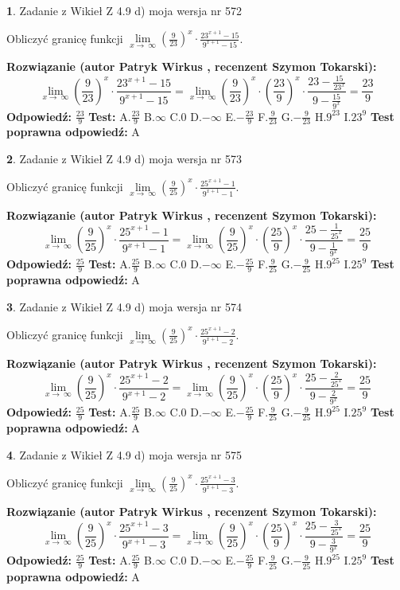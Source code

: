 \documentclass[12pt, a4paper]{article}
\theoremstyle{definition} %
\newtheorem{zad}{}
\newcommand{\zadStart}[1]{\begin{zad}#1\newline}
\newcommand{\zadStop}{\end{zad}}
\newcommand{\rozwStart}[2]{\noindent \textbf{Rozwiązanie (autor #1 , recenzent #2): }\newline}
\newcommand{\rozwStop}{\newline}
\newcommand{\odpStart}{\noindent \textbf{Odpowiedź:}\newline}
\newcommand{\odpStop}{\newline}
\newcommand{\testStart}{\noindent \textbf{Test:}\newline}
\newcommand{\testStop}{\newline}
\newcommand{\kluczStart}{\noindent \textbf{Test poprawna odpowiedź:}\newline}
\newcommand{\kluczStop}{\newline}
\begin{document}
\zadStart{Zadanie z Wikieł Z 4.9 d) moja wersja nr 572}


Obliczyć granicę funkcji  $\lim\limits_{x\to\ \infty}(\frac{9}{23})^{x}\cdot\frac{23^{x+1}-15}{9^{x+1}-15}$.
\zadStop
\rozwStart{Patryk Wirkus}{Szymon Tokarski}
$$\lim\limits_{x\to\ \infty}(\frac{9}{23})^{x}\cdot\frac{23^{x+1}-15}{9^{x+1}-15}=\lim\limits_{x\to\ \infty}(\frac{9}{23})^{x}\cdot(\frac{23}{9})^{x} \cdot \frac{23-\frac{15}{23^{x}}}{9-\frac{15}{9^{x}}} = \frac{23}{9}$$
\rozwStop
\odpStart
$\frac{23}{9}$
\odpStop
\testStart
A.$\frac{23}{9}$ B.$\infty$ C.$0$ D.$-\infty$ E.$-\frac{23}{9}$
F.$\frac{9}{23}$ G.$-\frac{9}{23}$
H.$9^{23}$
I.$23^{9}$
\testStop
\kluczStart
A
\kluczStop



\zadStart{Zadanie z Wikieł Z 4.9 d) moja wersja nr 573}


Obliczyć granicę funkcji  $\lim\limits_{x\to\ \infty}(\frac{9}{25})^{x}\cdot\frac{25^{x+1}-1}{9^{x+1}-1}$.
\zadStop
\rozwStart{Patryk Wirkus}{Szymon Tokarski}
$$\lim\limits_{x\to\ \infty}(\frac{9}{25})^{x}\cdot\frac{25^{x+1}-1}{9^{x+1}-1}=\lim\limits_{x\to\ \infty}(\frac{9}{25})^{x}\cdot(\frac{25}{9})^{x} \cdot \frac{25-\frac{1}{25^{x}}}{9-\frac{1}{9^{x}}} = \frac{25}{9}$$
\rozwStop
\odpStart
$\frac{25}{9}$
\odpStop
\testStart
A.$\frac{25}{9}$ B.$\infty$ C.$0$ D.$-\infty$ E.$-\frac{25}{9}$
F.$\frac{9}{25}$ G.$-\frac{9}{25}$
H.$9^{25}$
I.$25^{9}$
\testStop
\kluczStart
A
\kluczStop



\zadStart{Zadanie z Wikieł Z 4.9 d) moja wersja nr 574}


Obliczyć granicę funkcji  $\lim\limits_{x\to\ \infty}(\frac{9}{25})^{x}\cdot\frac{25^{x+1}-2}{9^{x+1}-2}$.
\zadStop
\rozwStart{Patryk Wirkus}{Szymon Tokarski}
$$\lim\limits_{x\to\ \infty}(\frac{9}{25})^{x}\cdot\frac{25^{x+1}-2}{9^{x+1}-2}=\lim\limits_{x\to\ \infty}(\frac{9}{25})^{x}\cdot(\frac{25}{9})^{x} \cdot \frac{25-\frac{2}{25^{x}}}{9-\frac{2}{9^{x}}} = \frac{25}{9}$$
\rozwStop
\odpStart
$\frac{25}{9}$
\odpStop
\testStart
A.$\frac{25}{9}$ B.$\infty$ C.$0$ D.$-\infty$ E.$-\frac{25}{9}$
F.$\frac{9}{25}$ G.$-\frac{9}{25}$
H.$9^{25}$
I.$25^{9}$
\testStop
\kluczStart
A
\kluczStop



\zadStart{Zadanie z Wikieł Z 4.9 d) moja wersja nr 575}


Obliczyć granicę funkcji  $\lim\limits_{x\to\ \infty}(\frac{9}{25})^{x}\cdot\frac{25^{x+1}-3}{9^{x+1}-3}$.
\zadStop
\rozwStart{Patryk Wirkus}{Szymon Tokarski}
$$\lim\limits_{x\to\ \infty}(\frac{9}{25})^{x}\cdot\frac{25^{x+1}-3}{9^{x+1}-3}=\lim\limits_{x\to\ \infty}(\frac{9}{25})^{x}\cdot(\frac{25}{9})^{x} \cdot \frac{25-\frac{3}{25^{x}}}{9-\frac{3}{9^{x}}} = \frac{25}{9}$$
\rozwStop
\odpStart
$\frac{25}{9}$
\odpStop
\testStart
A.$\frac{25}{9}$ B.$\infty$ C.$0$ D.$-\infty$ E.$-\frac{25}{9}$
F.$\frac{9}{25}$ G.$-\frac{9}{25}$
H.$9^{25}$
I.$25^{9}$
\testStop
\kluczStart
A
\kluczStop
\end{document}
